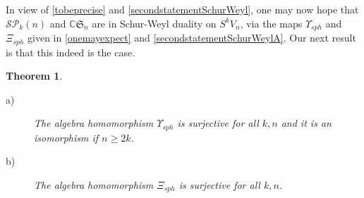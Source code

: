 \documentclass[10pt,hidelinks]{article}
\newcommand{\SpheAlg}{{\mathcal{SP} }_{k}}
\newcommand{\CC}{ \mathbb C }
\newcommand{\Si}{\mathfrak{S}}
\newtheorem{theorem}{Theorem}
\numberwithin{equation}{section}
\begin{document}
\medskip

In view of \eqref{tobeprecise} and \eqref{secondstatementSchurWeyl}, 
one may now hope that $ \SpheAlg(n) $ and $  \CC \Si_n $ are in Schur-Weyl duality
on $ S^k V_n  $, via the maps 
$ \Upsilon_{sph} $ and $   \Xi_{sph} $ given in \eqref{onemayexpect} and
\eqref{secondstatementSchurWeylA}. 
Our next result is that this indeed is the case.
\begin{theorem}\label{teorem 6}
  \begin{description}
  \item[a)] 
    The algebra homomorphism $   \Upsilon_{sph} $ is surjective for all $k, n $ and it 
  is an isomorphism if $ n \ge 2k$. 
\item[b)]    The algebra homomorphism $   \Xi_{sph} $ is surjective for all $k, n $. 
\end{description}  
  \end{theorem}
\end{document}
